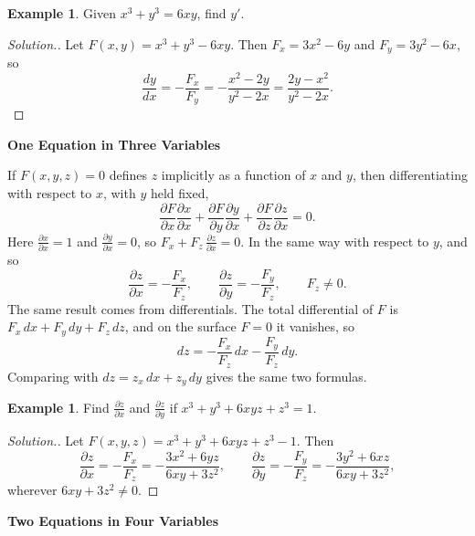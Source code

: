 \documentclass[11pt,a4paper]{article}
\theoremstyle{definition}
\newtheorem{exa}[thm]{Example}
\newenvironment{solution}
  {\renewcommand{\qedsymbol}{}\begin{proof}[\textit{Solution}.]}
  {\end{proof}}
\newcommand{\subhead}[1]{%
  \par\medskip\noindent\textbf{#1}\par\nobreak\smallskip}
\begin{document}
\begin{exa}
\label{ex:folium}
Given $x^3 + y^3 = 6xy$, find $y'$.
\end{exa}

\begin{solution}
Let $F(x,y) = x^3 + y^3 - 6xy$. Then $F_x = 3x^2 - 6y$ and $F_y = 3y^2 - 6x$, so
\[\frac{dy}{dx}=-\frac{F_x}{F_y} = -\frac{x^2 - 2y}{y^2 -2x} = \frac{2y -
x^2}{y^2 - 2x} .\]
\end{solution}

\subhead{One Equation in Three Variables}

If $F(x,y,z) = 0$ defines $z$ implicitly as a function of $x$ and $y$, then
differentiating with respect to $x$, with $y$ held fixed,
\[\frac{\partial F}{\partial x}\frac{\partial x}{\partial x} + \frac{\partial
F}{\partial y}\frac{\partial y}{\partial x} + \frac{\partial F}{\partial z}
\frac{\partial z}{\partial x} = 0 .\]
Here $\frac{\partial x}{\partial x} = 1$ and $\frac{\partial y}{\partial x} = 0$,
so $F_x + F_z\, \frac{\partial z}{\partial x} =0$. In the same way with respect
to $y$, and so
\[\frac{\partial z}{\partial x} = -\frac{F_x}{F_z},\qquad \frac{\partial
z}{\partial y} = -\frac{F_y}{F_z},\qquad F_z\neq 0 .\]
The same result comes from differentials. The total differential of $F$ is
$F_x\,dx + F_y\,dy + F_z\,dz$, and on the surface $F = 0$ it vanishes, so
\[dz = -\frac{F_x}{F_z}\,dx - \frac{F_y}{F_z}\,dy .\]
Comparing with $dz = z_x\,dx + z_y\,dy$ gives the same two formulas.

\begin{exa}
\label{ex:implicit3}
Find $\frac{\partial z}{\partial x}$ and $\frac{\partial z}{\partial y}$ if
$x^3 + y^3 + 6xyz + z^3 = 1$.
\end{exa}

\begin{solution}
Let $F(x,y,z) = x^3 + y^3 + 6xyz + z^3 - 1$. Then
\[\frac{\partial z}{\partial x} = -\frac{F_x}{F_z} = -\frac{3x^2 + 6yz}{6xy +
3z^2},\qquad \frac{\partial z}{\partial y} = -\frac{F_y}{F_z} = -\frac{3y^2 +
6xz}{6xy + 3z^2},\]
wherever $6xy + 3z^2\neq 0$.
\end{solution}

\subhead{Two Equations in Four Variables}
\end{document}
